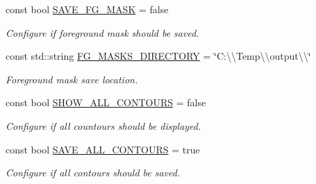\begin{DoxyCompactItemize}
\mbox{\label{namespacedto_1_1_configuration_afd3d3415ae742788142f386b6e4601f2}} 
const bool \mbox{\hyperlink{namespacedto_1_1_configuration_afd3d3415ae742788142f386b6e4601f2}{S\+A\+V\+E\+\_\+\+F\+G\+\_\+\+M\+A\+SK}} = false
\begin{DoxyCompactList}\small\item\em Configure if foreground mask should be saved. \end{DoxyCompactList}\item 
\mbox{\label{namespacedto_1_1_configuration_a7acfeb0b7d8c88c02008a86105b7b231}} 
const std\+::string \mbox{\hyperlink{namespacedto_1_1_configuration_a7acfeb0b7d8c88c02008a86105b7b231}{F\+G\+\_\+\+M\+A\+S\+K\+S\+\_\+\+D\+I\+R\+E\+C\+T\+O\+RY}} = \char`\"{}C\+:\textbackslash{}\textbackslash{}\+Temp\textbackslash{}\textbackslash{}output\textbackslash{}\textbackslash{}\char`\"{}
\begin{DoxyCompactList}\small\item\em Foreground mask save location. \end{DoxyCompactList}\item 
\mbox{\label{namespacedto_1_1_configuration_aeb4c447ac6b539e23eecff9499e66c4d}} 
const bool \mbox{\hyperlink{namespacedto_1_1_configuration_aeb4c447ac6b539e23eecff9499e66c4d}{S\+H\+O\+W\+\_\+\+A\+L\+L\+\_\+\+C\+O\+N\+T\+O\+U\+RS}} = false
\begin{DoxyCompactList}\small\item\em Configure if all countours should be displayed. \end{DoxyCompactList}\item 
\mbox{\label{namespacedto_1_1_configuration_a32ccabb080e39df4769d75ea72ddf624}} 
const bool \mbox{\hyperlink{namespacedto_1_1_configuration_a32ccabb080e39df4769d75ea72ddf624}{S\+A\+V\+E\+\_\+\+A\+L\+L\+\_\+\+C\+O\+N\+T\+O\+U\+RS}} = true
\begin{DoxyCompactList}\small\item\em Configure if all contours should be saved. \end{DoxyCompactList}\item 
\mbox{\label{namespacedto_1_1_configuration_ad48e9706dbe047808571b1696dab6e10}} 

\end{DoxyCompactItemize}
